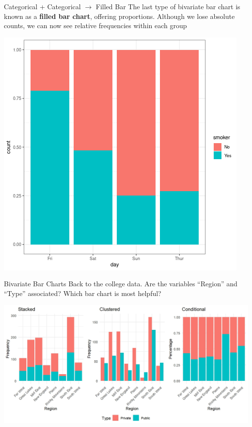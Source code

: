 \documentclass{beamer}
\begin{document}
\begin{frame}{Categorical + Categorical $\rightarrow$ Filled Bar}
The last type of bivariate bar chart is known as a \textbf{filled bar chart}, offering proportions. Although we lose absolute counts, we can now see relative frequencies within each group

\begin{center}
\includegraphics[scale=0.35]{img/bar_fill.png}
\end{center}
\end{frame}


\begin{frame}{Bivariate Bar Charts}
Back to the college data. Are the variables “Region” and “Type” associated? Which bar chart is most helpful?
\begin{center}
\includegraphics[scale=.5]{img/CollegeComboAssoc.jpeg}
\end{center}
\end{frame}
\end{document}
